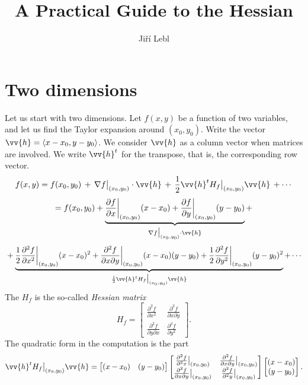 \documentclass[12pt]{article}
\title{A Practical Guide to the Hessian}
\author{Ji\v{r}\'i Lebl}
\begin{document}
\maketitle

\section{Two dimensions}

Let us start with two dimensions.
Let $f(x,y)$ be a function of two variables, and let us
find the
Taylor expansion around $(x_0,y_0)$.
Write the vector $\vv{h} = \langle x-x_0, y-y_0 \rangle$.  We
consider $\vv{h}$ as a column vector when matrices are involved.
We write $\vv{h}^t$ for the transpose, that is, the corresponding
row vector.
$$
f(x,y) = f(x_0,y_0) \, + \,
\nabla f\big|_{(x_0,y_0)} \cdot \vv{h}
\, + \,
\frac{1}{2} \vv{h}^{t} H_f\big|_{(x_0,y_0)} \vv{h} \,
+ \cdots
$$
$$
 = f(x_0,y_0) +
\underbrace{\frac{\partial f}{\partial x}\bigg|_{(x_0,y_0)} (x-x_0) +
\frac{\partial f}{\partial y}\bigg|_{(x_0,y_0)} (y-y_0)}_{\nabla
f\big|_{(x_0,y_0)} \cdot \vv{h}}
+ {}
$$
$$
{} +
\underbrace{%
\frac{1}{2} \frac{\partial^2 f}{\partial x^2}\bigg|_{(x_0,y_0)} (x-x_0)^2 +
\frac{\partial^2 f}{\partial x \partial y}\bigg|_{(x_0,y_0)} (x-x_0)(y-y_0) +
\frac{1}{2} \frac{\partial^2 f}{\partial y^2}\bigg|_{(x_0,y_0)} (y-y_0)^2}_{%
\frac{1}{2} \vv{h}^{t} H_f\big|_{(x_0,y_0)} \vv{h}}
+
\cdots
$$
The $H_f$ is the so-called \emph{Hessian matrix}
\begin{equation*}
H_f
=
\begin{bmatrix}
\frac{\partial^2 f}{\partial x^2} &
\frac{\partial^2 f}{\partial x \partial y} \\
\frac{\partial^2 f}{\partial y \partial x} &
\frac{\partial^2 f}{\partial y^2}
\end{bmatrix}
.
\end{equation*}
The quadratic form in the computation is the part
\begin{equation*}
\vv{h}^{t} H_f \big|_{(x_0,y_0)} \vv{h}
=
\begin{bmatrix}
(x-x_0) & (y-y_0)
\end{bmatrix}
\begin{bmatrix}
\frac{\partial^2 f}{\partial^2 x}\big|_{(x_0,y_0)} &
\frac{\partial^2 f}{\partial x \partial y}\big|_{(x_0,y_0)} \\
\frac{\partial^2 f}{\partial x \partial y}\big|_{(x_0,y_0)} &
\frac{\partial^2 f}{\partial^2 y}\big|_{(x_0,y_0)}
\end{bmatrix}
\begin{bmatrix}
(x-x_0) \\ (y-y_0)
\end{bmatrix}
.
\end{equation*}
\end{document}
